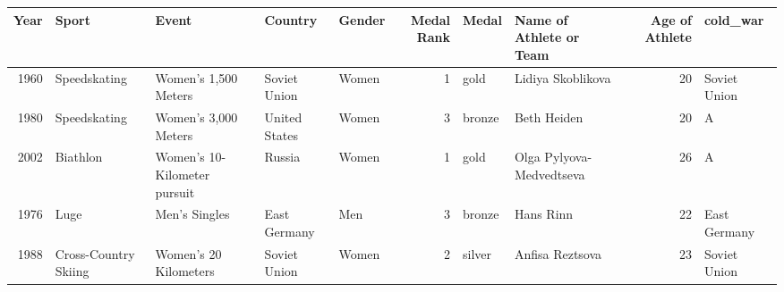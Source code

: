 \documentclass[]{book}
\theoremstyle{definition}
\theoremstyle{definition}
\theoremstyle{definition}
\theoremstyle{remark}
\begin{document}
\begin{tabular}{r|l|l|l|l|r|l|l|r|l}
\hline
Year & Sport & Event & Country & Gender & Medal Rank & Medal & Name of Athlete or Team & Age of Athlete & cold\_war\\
\hline
1960 & Speedskating & Women's 1,500 Meters & Soviet Union & Women & 1 & gold & Lidiya Skoblikova & 20 & Soviet Union\\
\hline
1980 & Speedskating & Women's 3,000 Meters & United States & Women & 3 & bronze & Beth Heiden & 20 & A\\
\hline
2002 & Biathlon & Women's 10-Kilometer pursuit & Russia & Women & 1 & gold & Olga Pylyova-Medvedtseva & 26 & A\\
\hline
1976 & Luge & Men's Singles & East Germany & Men & 3 & bronze & Hans Rinn & 22 & East Germany\\
\hline
1988 & Cross-Country Skiing & Women's 20 Kilometers & Soviet Union & Women & 2 & silver & Anfisa Reztsova & 23 & Soviet Union\\
\hline
\end{tabular}
\end{document}
